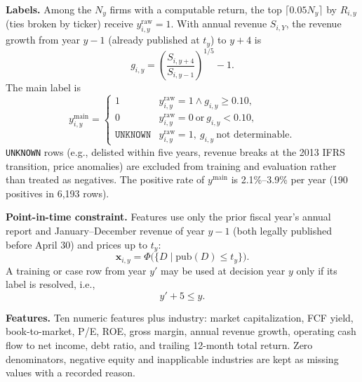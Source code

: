 \documentclass[conference]{IEEEtran}
\begin{document}
\textbf{Labels.} Among the $N_y$ firms with a computable return, the top $\lceil 0.05 N_y \rceil$ by $R_{i,y}$ (ties broken by ticker) receive $y^{\text{raw}}_{i,y}=1$. With annual revenue $S_{i,Y}$, the revenue growth from year $y-1$ (already published at $t_y$) to $y+4$ is
\begin{equation}
g_{i,y} = \left(\frac{S_{i,y+4}}{S_{i,y-1}}\right)^{1/5} - 1 .
\end{equation}
The main label is
\begin{equation}
y^{\text{main}}_{i,y} =
\begin{cases}
1 & y^{\text{raw}}_{i,y}=1 \wedge g_{i,y} \ge 0.10,\\
0 & y^{\text{raw}}_{i,y}=0 \ \text{or}\ g_{i,y} < 0.10,\\
\texttt{UNKNOWN} & y^{\text{raw}}_{i,y}=1,\ g_{i,y}\ \text{not determinable}.
\end{cases}
\end{equation}
\texttt{UNKNOWN} rows (e.g., delisted within five years, revenue breaks at the 2013 IFRS transition, price anomalies) are excluded from training and evaluation rather than treated as negatives. The positive rate of $y^{\text{main}}$ is 2.1\%--3.9\% per year (190 positives in 6,193 rows).

\textbf{Point-in-time constraint.} Features use only the prior fiscal year's annual report and January--December revenue of year $y-1$ (both legally published before April 30) and prices up to $t_y$:
\begin{equation}
\mathbf{x}_{i,y} = \Phi\big(\{D \mid \text{pub}(D) \le t_y\}\big).
\end{equation}
A training or case row from year $y'$ may be used at decision year $y$ only if its label is resolved, i.e.,
\begin{equation}
y' + 5 \le y .
\end{equation}

\textbf{Features.} Ten numeric features plus industry: market capitalization, FCF yield, book-to-market, P/E, ROE, gross margin, annual revenue growth, operating cash flow to net income, debt ratio, and trailing 12-month total return. Zero denominators, negative equity and inapplicable industries are kept as missing values with a recorded reason.
\end{document}
